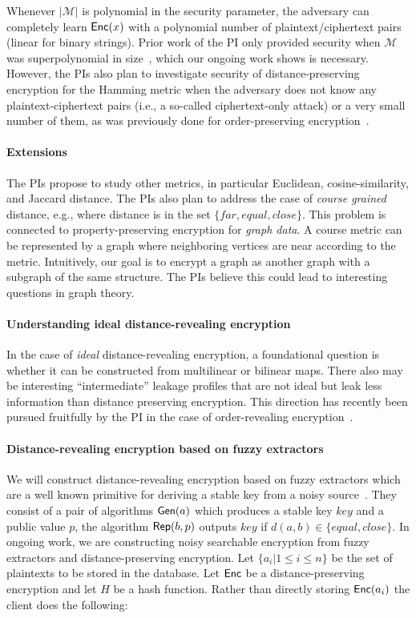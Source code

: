 Whenever $|\mathcal{M}|$ is polynomial in the security parameter, the adversary can completely learn $\mathsf{Enc}(x)$ with a polynomial number of plaintext/ciphertext pairs (linear for binary strings).  Prior work of the PI only provided security when $\mathcal{M}$ was superpolynomial in size~\cite{EPRINT:ABCFG16}, which our ongoing work shows is necessary.  However, the PIs also plan to investigate security of distance-preserving encryption for the Hamming metric when the adversary does not know any plaintext-ciphertext pairs (i.e., a so-called ciphertext-only attack) or a very small number of them, as was previously done for order-preserving encryption~\cite{C:BolCheONe11}.
 
 \paragraph{Extensions} The PIs propose to study other metrics, in particular Euclidean, cosine-similarity, and Jaccard distance.    The PIs also plan to address the case of \emph{course grained} distance, e.g., where distance is in the set $\{far, equal, close\}$.  This problem is connected to property-preserving encryption for \emph{graph data}.  A course metric can be represented by a graph where neighboring vertices are near according to the metric.  Intuitively, our goal is to encrypt a graph as another graph with a subgraph of the same structure. The PIs believe this could lead to interesting questions in graph theory.

\paragraph{Understanding ideal distance-revealing encryption}
In the case of \emph{ideal} distance-revealing encryption, a foundational question is whether it can be constructed from multilinear or bilinear maps.  There also may be interesting ``intermediate'' leakage profiles that are not ideal but leak less information than distance preserving encryption.   This direction has recently been pursued fruitfully by the PI in the case of order-revealing encryption~\cite{EPRINT:CLOZ16}.

\paragraph{Distance-revealing encryption based on fuzzy extractors}
We will construct distance-revealing encryption based on fuzzy extractors which are a well known primitive for deriving a stable key from a noisy source~\cite{EC:DodReySmi04}.  They consist of a pair of algorithms $\mathsf{Gen}(a)$ which produces a stable key $key$ and a public value $p$, the algorithm $\mathsf{Rep}(b, p)$ outputs $key$ if $d(a,b)\in\{equal,close\}$.  In ongoing work, we are constructing noisy searchable encryption from fuzzy extractors and distance-preserving encryption.  Let $\{a_i | 1\le i \le n\}$ be the set of plaintexts to be stored in the database.  Let $\mathsf{Enc}$ be a distance-preserving encryption and let $H$ be a hash function.  Rather than directly storing $\mathsf{Enc}(a_i)$ the client does the following:


